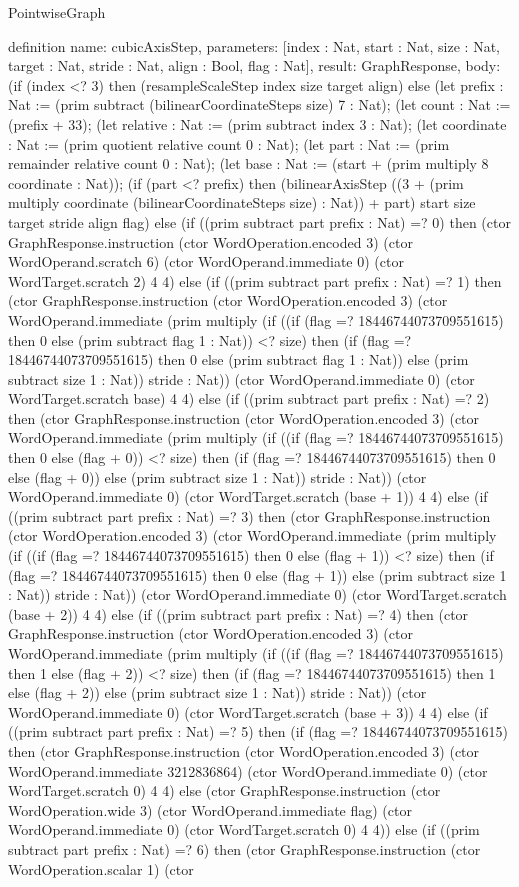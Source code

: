 \begin{lexlean}{PointwiseGraph}
\begin{semanticmodule}
definition{
  name: cubicAxisStep,
  parameters: [index : Nat, start : Nat, size : Nat, target : Nat, stride : Nat, align : Bool, flag : Nat],
  result: GraphResponse,
  body: (if (index <? 3) then (resampleScaleStep index size target align) else (let prefix : Nat := (prim subtract (bilinearCoordinateSteps size) 7 : Nat);
      (let count : Nat := (prefix + 33);
      (let relative : Nat := (prim subtract index 3 : Nat);
      (let coordinate : Nat := (prim quotient relative count 0 : Nat);
      (let part : Nat := (prim remainder relative count 0 : Nat);
      (let base : Nat := (start + (prim multiply 8 coordinate : Nat));
      (if (part <? prefix) then (bilinearAxisStep ((3 + (prim multiply coordinate (bilinearCoordinateSteps size) : Nat)) + part) start size target stride align flag) else (if ((prim subtract part prefix : Nat) =? 0) then (ctor GraphResponse.instruction (ctor WordOperation.encoded 3) (ctor WordOperand.scratch 6) (ctor WordOperand.immediate 0) (ctor WordTarget.scratch 2) 4 4) else (if ((prim subtract part prefix : Nat) =? 1) then (ctor GraphResponse.instruction (ctor WordOperation.encoded 3) (ctor WordOperand.immediate (prim multiply (if ((if (flag =? 18446744073709551615) then 0 else (prim subtract flag 1 : Nat)) <? size) then (if (flag =? 18446744073709551615) then 0 else (prim subtract flag 1 : Nat)) else (prim subtract size 1 : Nat)) stride : Nat)) (ctor WordOperand.immediate 0) (ctor WordTarget.scratch base) 4 4) else (if ((prim subtract part prefix : Nat) =? 2) then (ctor GraphResponse.instruction (ctor WordOperation.encoded 3) (ctor WordOperand.immediate (prim multiply (if ((if (flag =? 18446744073709551615) then 0 else (flag + 0)) <? size) then (if (flag =? 18446744073709551615) then 0 else (flag + 0)) else (prim subtract size 1 : Nat)) stride : Nat)) (ctor WordOperand.immediate 0) (ctor WordTarget.scratch (base + 1)) 4 4) else (if ((prim subtract part prefix : Nat) =? 3) then (ctor GraphResponse.instruction (ctor WordOperation.encoded 3) (ctor WordOperand.immediate (prim multiply (if ((if (flag =? 18446744073709551615) then 0 else (flag + 1)) <? size) then (if (flag =? 18446744073709551615) then 0 else (flag + 1)) else (prim subtract size 1 : Nat)) stride : Nat)) (ctor WordOperand.immediate 0) (ctor WordTarget.scratch (base + 2)) 4 4) else (if ((prim subtract part prefix : Nat) =? 4) then (ctor GraphResponse.instruction (ctor WordOperation.encoded 3) (ctor WordOperand.immediate (prim multiply (if ((if (flag =? 18446744073709551615) then 1 else (flag + 2)) <? size) then (if (flag =? 18446744073709551615) then 1 else (flag + 2)) else (prim subtract size 1 : Nat)) stride : Nat)) (ctor WordOperand.immediate 0) (ctor WordTarget.scratch (base + 3)) 4 4) else (if ((prim subtract part prefix : Nat) =? 5) then (if (flag =? 18446744073709551615) then (ctor GraphResponse.instruction (ctor WordOperation.encoded 3) (ctor WordOperand.immediate 3212836864) (ctor WordOperand.immediate 0) (ctor WordTarget.scratch 0) 4 4) else (ctor GraphResponse.instruction (ctor WordOperation.wide 3) (ctor WordOperand.immediate flag) (ctor WordOperand.immediate 0) (ctor WordTarget.scratch 0) 4 4)) else (if ((prim subtract part prefix : Nat) =? 6) then (ctor GraphResponse.instruction (ctor WordOperation.scalar 1) (ctor }
\end{semanticmodule}
\end{lexlean}
